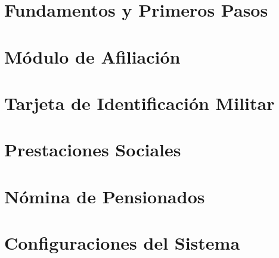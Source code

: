 \documentclass[
    11pt,
    oneside,
    openright,
    spanish,
    a4paper
]{book}
\begin{document}



\frontmatter
{}





\tableofcontents
\listoffigures
\listoftables

\mainmatter
{}

\part{Fundamentos y Primeros Pasos}


\part{Módulo de Afiliación}


\part{Tarjeta de Identificación Militar}


\part{Prestaciones Sociales}


\part{Nómina de Pensionados}


\part{Configuraciones del Sistema}


% 


\backmatter
\printindex
\end{document}
